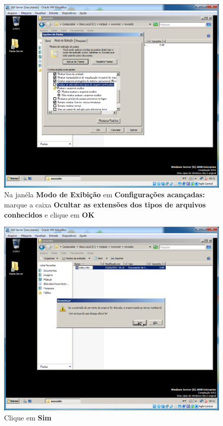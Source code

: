 \documentclass[10pt]{article}
\begin{document}
\begin{figure}[H]
    \centering
    \caption{Na janéla \textbf{Modo de Exibição} em \textbf{Configurações acançadas:} marque a caixa \textbf{Ocultar as extensões dos tipos de arquivos conhecidos} e clique em \textbf{OK}}
    \label{fig:5532031}
    \includegraphics[width=\linewidth]{images/IIS/criando_um_novo_site/031.png}
\end{figure}
\begin{figure}[H]
    \centering
    \caption{Clique em \textbf{Sim}}
    \label{fig:5532032}
    \includegraphics[width=\linewidth]{images/IIS/criando_um_novo_site/032.png}
\end{figure}
\end{document}
